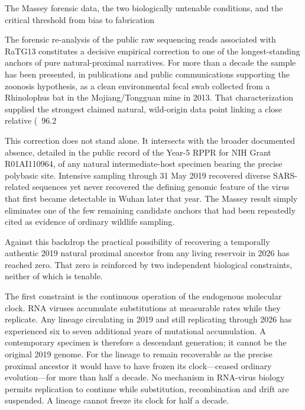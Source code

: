 The Massey forensic data, the two biologically untenable conditions, and the critical threshold from bias to fabrication

The forensic re-analysis of the public raw sequencing reads associated with RaTG13 constitutes a decisive empirical correction to one of the longest-standing anchors of pure natural-proximal narratives. For more than a decade the sample has been presented, in publications and public communications supporting the zoonosis hypothesis, as a clean environmental fecal swab collected from a Rhinolophus bat in the Mojiang/Tongguan mine in 2013. That characterization supplied the strongest claimed natural, wild-origin data point linking a close relative (~96.2 %

This correction does not stand alone. It intersects with the broader documented absence, detailed in the public record of the Year-5 RPPR for NIH Grant R01AI110964, of any natural intermediate-host specimen bearing the precise polybasic site. Intensive sampling through 31 May 2019 recovered diverse SARS-related sequences yet never recovered the defining genomic feature of the virus that first became detectable in Wuhan later that year. The Massey result simply eliminates one of the few remaining candidate anchors that had been repeatedly cited as evidence of ordinary wildlife sampling.

Against this backdrop the practical possibility of recovering a temporally authentic 2019 natural proximal ancestor from any living reservoir in 2026 has reached zero. That zero is reinforced by two independent biological constraints, neither of which is tenable.

The first constraint is the continuous operation of the endogenous molecular clock. RNA viruses accumulate substitutions at measurable rates while they replicate. Any lineage circulating in 2019 and still replicating through 2026 has experienced six to seven additional years of mutational accumulation. A contemporary specimen is therefore a descendant generation; it cannot be the original 2019 genome. For the lineage to remain recoverable as the precise proximal ancestor it would have to have frozen its clock—ceased ordinary evolution—for more than half a decade. No mechanism in RNA-virus biology permits replication to continue while substitution, recombination and drift are suspended. A lineage cannot freeze its clock for half a decade.

